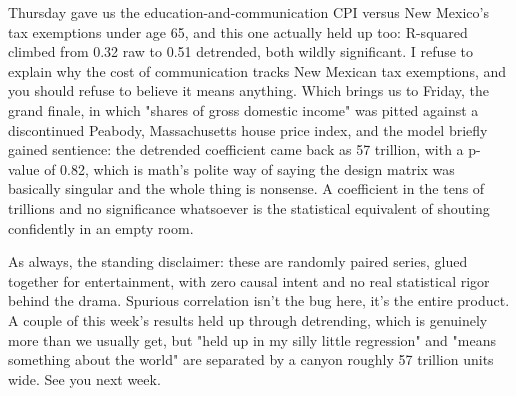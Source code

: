 Thursday gave us the education-and-communication CPI versus New Mexico's tax exemptions under age 65, and this one actually held up too: R-squared climbed from 0.32 raw to 0.51 detrended, both wildly significant. I refuse to explain why the cost of communication tracks New Mexican tax exemptions, and you should refuse to believe it means anything. Which brings us to Friday, the grand finale, in which "shares of gross domestic income" was pitted against a discontinued Peabody, Massachusetts house price index, and the model briefly gained sentience: the detrended coefficient came back as 57 trillion, with a p-value of 0.82, which is math's polite way of saying the design matrix was basically singular and the whole thing is nonsense. A coefficient in the tens of trillions and no significance whatsoever is the statistical equivalent of shouting confidently in an empty room.

As always, the standing disclaimer: these are randomly paired series, glued together for entertainment, with zero causal intent and no real statistical rigor behind the drama. Spurious correlation isn't the bug here, it's the entire product. A couple of this week's results held up through detrending, which is genuinely more than we usually get, but "held up in my silly little regression" and "means something about the world" are separated by a canyon roughly 57 trillion units wide. See you next week.
